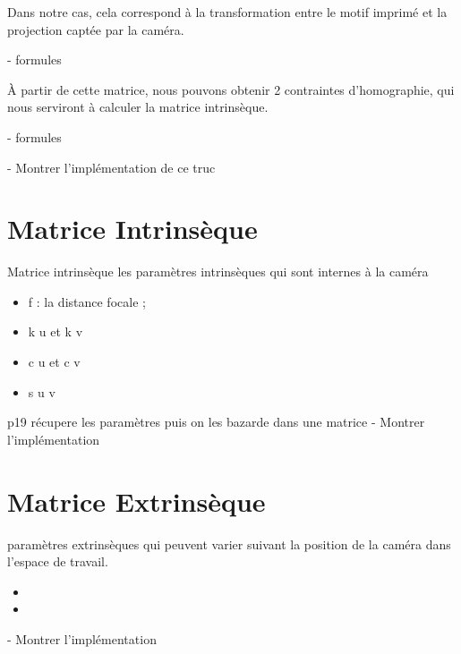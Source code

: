 \documentclass{article}
\begin{document}
Dans notre cas, cela correspond à la transformation entre le motif imprimé et la projection captée par la caméra.

- formules

À partir de cette matrice, nous pouvons obtenir 2 contraintes d'homographie, qui nous serviront à calculer la matrice intrinsèque.


- formules

- Montrer l'implémentation de ce truc



\section{Matrice Intrinsèque}

Matrice intrinsèque
les paramètres intrinsèques qui sont internes à la caméra
\begin{itemize}
\item f : la distance focale ;
\item k u  et  k v %
\item c u  et  c v %
\item s u v %
\end{itemize}

p19 récupere les paramètres puis on les bazarde dans une matrice
- Montrer l'implémentation



\section{Matrice Extrinsèque}
paramètres extrinsèques qui peuvent varier suivant la position de la caméra dans l'espace de travail.
\begin{itemize}
\item %
\item %
\end{itemize}
- Montrer l'implémentation
\end{document}
